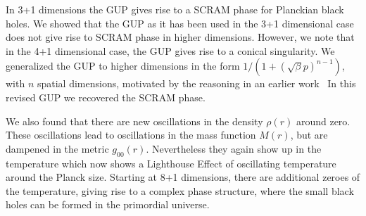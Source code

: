 In 3+1 dimensions the GUP gives rise to a SCRAM phase for Planckian black holes.
We showed that the  GUP as it has been used in the 3+1 dimensional case does 
not give rise to SCRAM phase in higher dimensions. However, we note that in
the 4+1 dimensional case, the GUP gives rise to a conical singularity.
We generalized the GUP to higher dimensions in the form 
$1/(1+(\sqrt{\beta}p)^{n-1})$, with $n$ spatial dimensions,
motivated by the reasoning in an earlier work~\cite{Koppel:2017rsf}
In this revised GUP we recovered the SCRAM phase.

We also found that there are new oscillations in the density $\rho(r)$ around 
zero. These oscillations lead to oscillations in the mass function $M(r)$, but are
dampened in the metric $g_{00}(r)$.
Nevertheless they again show up in the temperature which now shows a Lighthouse 
Effect of oscillating temperature around the Planck size. Starting at
8+1 dimensions, there are additional zeroes of the temperature, giving rise to
a complex phase structure, where the small black holes can be formed in the
primordial universe.

